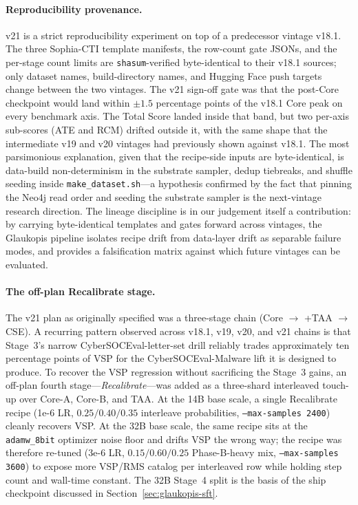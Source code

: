 \documentclass[webpdf,contemporary,large]{oup-authoring-template}
\theoremstyle{thmstyleone}
\theoremstyle{thmstyletwo}
\theoremstyle{thmstylethree}
\begin{document}
\paragraph{Reproducibility provenance.}
v21 is a strict reproducibility experiment on top of a predecessor vintage v18.1. The three Sophia-CTI template manifests, the row-count gate JSONs, and the per-stage count limits are \texttt{shasum}-verified byte-identical to their v18.1 sources; only dataset names, build-directory names, and Hugging Face push targets change between the two vintages. The v21 sign-off gate was that the post-Core checkpoint would land within $\pm 1.5$ percentage points of the v18.1 Core peak on every benchmark axis. The Total Score landed inside that band, but two per-axis sub-scores (ATE and RCM) drifted outside it, with the same shape that the intermediate v19 and v20 vintages had previously shown against v18.1. The most parsimonious explanation, given that the recipe-side inputs are byte-identical, is data-build non-determinism in the substrate sampler, dedup tiebreaks, and shuffle seeding inside \texttt{make\_dataset.sh}---a hypothesis confirmed by the fact that pinning the Neo4j read order and seeding the substrate sampler is the next-vintage research direction. The lineage discipline is in our judgement itself a contribution: by carrying byte-identical templates and gates forward across vintages, the Glaukopis pipeline isolates recipe drift from data-layer drift as separable failure modes, and provides a falsification matrix against which future vintages can be evaluated.

\paragraph{The off-plan Recalibrate stage.}
The v21 plan as originally specified was a three-stage chain (Core $\to$ +TAA $\to$ CSE). A recurring pattern observed across v18.1, v19, v20, and v21 chains is that Stage~3's narrow CyberSOCEval-letter-set drill reliably trades approximately ten percentage points of VSP for the CyberSOCEval-Malware lift it is designed to produce. To recover the VSP regression without sacrificing the Stage~3 gains, an off-plan fourth stage---\emph{Recalibrate}---was added as a three-shard interleaved touch-up over Core-A, Core-B, and TAA. At the 14B base scale, a single Recalibrate recipe (1e-6 LR, $0.25 / 0.40 / 0.35$ interleave probabilities, \texttt{--max-samples 2400}) cleanly recovers VSP. At the 32B base scale, the same recipe sits at the \texttt{adamw\_8bit} optimizer noise floor and drifts VSP the wrong way; the recipe was therefore re-tuned (3e-6 LR, $0.15 / 0.60 / 0.25$ Phase-B-heavy mix, \texttt{--max-samples 3600}) to expose more VSP/RMS catalog per interleaved row while holding step count and wall-time constant. The 32B Stage~4 split is the basis of the ship checkpoint discussed in Section~\ref{sec:glaukopis-sft}.
\end{document}
